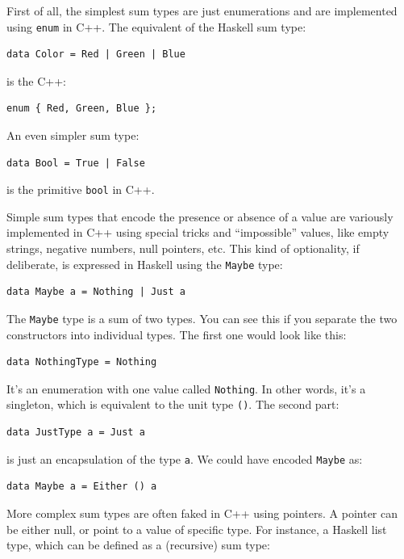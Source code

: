 First of all, the simplest sum types are just enumerations and are
implemented using \texttt{enum} in C++. The equivalent of the Haskell
sum type:

\begin{verbatim}
data Color = Red | Green | Blue
\end{verbatim}

\noindent
is the C++:

\begin{verbatim}
enum { Red, Green, Blue };
\end{verbatim}

\noindent
An even simpler sum type:

\begin{verbatim}
data Bool = True | False
\end{verbatim}

\noindent
is the primitive \texttt{bool} in C++.

Simple sum types that encode the presence or absence of a value are
variously implemented in C++ using special tricks and ``impossible''
values, like empty strings, negative numbers, null pointers, etc. This
kind of optionality, if deliberate, is expressed in Haskell using the
\texttt{Maybe} type:

\begin{verbatim}
data Maybe a = Nothing | Just a
\end{verbatim}

\noindent
The \texttt{Maybe} type is a sum of two types. You can see this if you
separate the two constructors into individual types. The first one would
look like this:

\begin{verbatim}
data NothingType = Nothing
\end{verbatim}

\noindent
It's an enumeration with one value called \texttt{Nothing}. In other
words, it's a singleton, which is equivalent to the unit type
\texttt{()}. The second part:

\begin{verbatim}
data JustType a = Just a
\end{verbatim}

\noindent
is just an encapsulation of the type \texttt{a}. We could have encoded
\texttt{Maybe} as:

\begin{verbatim}
data Maybe a = Either () a
\end{verbatim}

\noindent
More complex sum types are often faked in C++ using pointers. A pointer
can be either null, or point to a value of specific type. For instance,
a Haskell list type, which can be defined as a (recursive) sum type:

